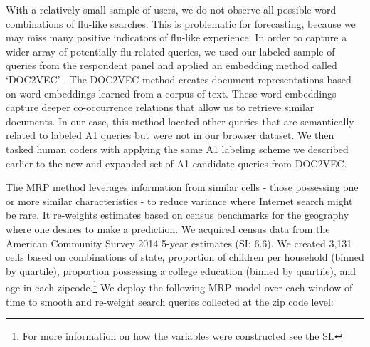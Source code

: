 \documentclass[fleqn,10pt]{wlscirep}
\begin{document}

With a relatively small sample of users, we do not observe all possible word combinations of flu-like searches. This is problematic for forecasting, because we may miss many positive indicators of flu-like experience. In order to capture a wider array of potentially flu-related queries, we used our labeled sample of queries from the respondent panel and applied an embedding method called `DOC2VEC' \cite{le_and_mikolov_2014}. The DOC2VEC method creates document representations based on word embeddings learned from a corpus of text. These word embeddings capture deeper co-occurrence relations that allow us to retrieve similar documents. In our case, this method located other queries that are semantically related to labeled A1 queries but were not in our browser dataset. We then tasked human coders with applying the same A1 labeling scheme we described earlier to the new and expanded set of A1 candidate queries from DOC2VEC.

The MRP method leverages information from similar cells - those possessing one or more similar characteristics - to reduce variance where Internet search might be rare. It re-weights estimates based on census benchmarks for the geography where one desires to make a prediction. We acquired census data from the American Community Survey 2014 5-year estimates (SI: 6.6). We created 3,131 cells based on combinations of state, proportion of children per household (binned by quartile), proportion possessing a college education (binned by quartile), and age in each zipcode.\footnote{For more information on how the variables were constructed see the SI.}  We deploy the following MRP model over each window of time to smooth and re-weight search queries collected at the zip code level:
\end{document}
